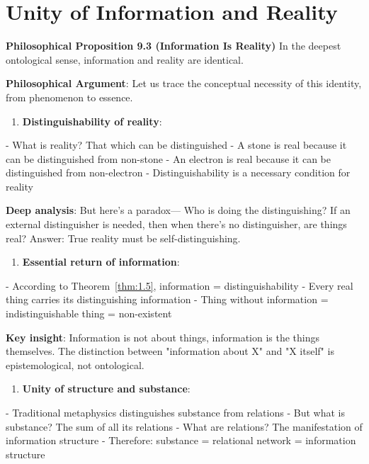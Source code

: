 \section{Unity of Information and Reality}
\label{sec:ch09_philosophy:unity-of-information-and-reality}

\textbf{Philosophical Proposition 9.3 (Information Is Reality)}
In the deepest ontological sense, information and reality are identical.

\textbf{Philosophical Argument}:
Let us trace the conceptual necessity of this identity, from phenomenon to essence.

\begin{enumerate}
\item \textbf{Distinguishability of reality}:
\end{enumerate}
   - What is reality? That which can be distinguished
   - A stone is real because it can be distinguished from non-stone
   - An electron is real because it can be distinguished from non-electron
   - Distinguishability is a necessary condition for reality
   
   \textbf{Deep analysis}: But here's a paradox---
   Who is doing the distinguishing? If an external distinguisher is needed,
   then when there's no distinguisher, are things real?
   Answer: True reality must be self-distinguishing.

\begin{enumerate}
\item \textbf{Essential return of information}:
\end{enumerate}
   - According to Theorem~\ref{thm:1.5}, information = distinguishability
   - Every real thing carries its distinguishing information
   - Thing without information = indistinguishable thing = non-existent
   
   \textbf{Key insight}: Information is not about things,
   information is the things themselves.
   The distinction between "information about X" and "X itself" is epistemological,
   not ontological.

\begin{enumerate}
\item \textbf{Unity of structure and substance}:
\end{enumerate}
   - Traditional metaphysics distinguishes substance from relations
   - But what is substance? The sum of all its relations
   - What are relations? The manifestation of information structure
   - Therefore: substance = relational network = information structure
   
